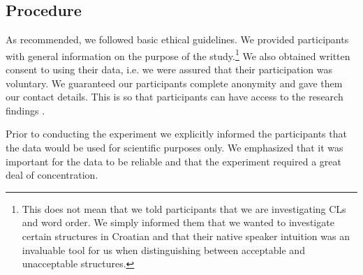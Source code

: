 \subsection{Procedure}
\label{Procedure}

As recommended, we followed basic ethical guidelines. We provided participants with general information on the purpose of the study.\footnote{This does not mean that we told participants that we are investigating CLs and word order. We simply informed them that we wanted to investigate certain structures in Croatian and that their native speaker intuition was an invaluable tool for us when distinguishing between acceptable and unacceptable structures.} We also obtained written consent to using their data, i.e. we were assured that their participation was voluntary. We guaranteed our participants complete anonymity and gave them our contact details. This is so that participants can have access to the research findings \citep[cf.][71]{KrugSell13}.

Prior to conducting the experiment we explicitly informed the participants that the data would be used for scientific purposes only. We emphasized that it was important for the data to be reliable and that the experiment required a great deal of concentration. 

